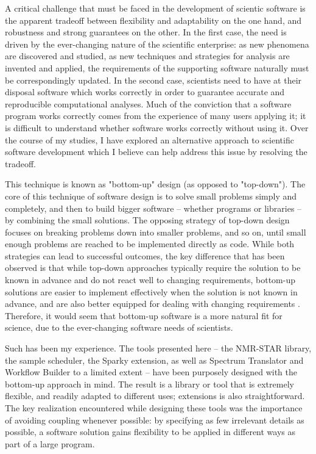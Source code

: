 A critical challenge that must be faced in the development of scientic software
is the apparent tradeoff between flexibility and adaptability on the one hand,
and robustness and strong guarantees on the other.  In the first case, the 
need is driven by the ever-changing nature of the scientific enterprise: as
new phenomena are discovered and studied, as new techniques and strategies for
analysis are invented and applied, the requirements of the supporting software
naturally must be correspondingly updated.  In the second case, scientists 
need to have at their disposal software which works correctly in order to 
guarantee accurate and reproducible computational analyses.  Much of the 
conviction that a software program works correctly comes from the experience 
of many users applying it; it is difficult to understand whether software 
works correctly without using it.  Over the course of my studies, I have 
explored an alternative approach to scientific software development which I 
believe can help address this issue by resolving the tradeoff.

This technique is known as "bottom-up" \cite{bottomup1994, bottomup2004} design
(as opposed to "top-down").  The core of this technique of software design is
to solve small problems simply and completely, and then to build bigger software
 -- whether programs or libraries -- by combining the small solutions.  The
opposing strategy of top-down design focuses on breaking problems down into 
smaller problems, and so on, until small enough problems are reached to be 
implemented directly as code.  While both strategies can lead to successful
outcomes, the key difference that has been observed is that while top-down
approaches typically require the solution to be known in advance and do not
react well to changing requirements, bottom-up solutions are easier to implement
effectively when the solution is not known in advance, and are also better
equipped for dealing with changing requirements 
\cite{topdown_bottomup, bottomup1994, bottomup2004}.  Therefore, it would seem
that bottom-up software is a more natural fit for science, due to the ever-changing
software needs of scientists.

Such has been my experience.  The tools presented here -- the NMR-STAR library,
the sample scheduler, the Sparky extension, as well as Spectrum Translator and
Workflow Builder to a limited extent -- have been purposely designed with 
the bottom-up approach in mind.  The result is a library or tool that is 
extremely flexible, and readily adapted to different uses; extensions is also
straightforward.  The key realization encountered while designing these tools
was the importance of avoiding coupling \cite{coupling1992} whenever possible:
by specifying as few irrelevant details as possible, a software solution gains
flexibility to be applied in different ways as part of a large program.
 

